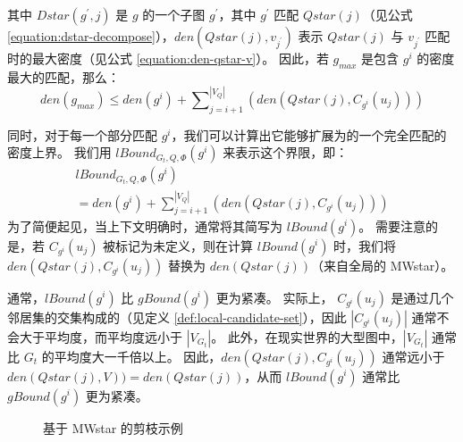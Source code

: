 其中 $Dstar(g^\prime, j)$ 是 $g$ 的一个子图 $g^\prime$，其中 $g^\prime$ 匹配 $Qstar(j)$（见公式 \ref{equation:dstar-decompose}），$den(Qstar(j), v_{j^\prime})$ 表示 $Qstar(j)$ 与 $v_{j^\prime}$ 匹配时的最大密度（见公式 \ref{equation:den-qstar-v}）。
因此，若 $g_{max}$ 是包含 $g^i$ 的密度最大的匹配，那么：
\[
	den(g_{max}) \leq den(g^i) + \sum\nolimits_{j=i+1}^{|V_Q|} \left(den(Qstar(j), C_{g^i}(u_j))\right)
\]

同时，对于每一个部分匹配 $g^i$，我们可以计算出它能够扩展为的一个完全匹配的密度上界。
我们用 $lBound_{G_t, Q, \Phi}(g^i)$ 来表示这个界限，即：
\begin{equation*}
    \begin{multlined}
    lBound_{G_t, Q, \Phi}(g^i) \\ = den(g^i) + \sum\nolimits_{j=i+1}^{|V_Q|} \left(den(Qstar(j), C_{g^i}(u_j))\right)
    \end{multlined}
    \end{equation*}
为了简便起见，当上下文明确时，通常将其简写为 $lBound(g^i)$。
需要注意的是，若 $C_{g^i}(u_j)$ 被标记为未定义，则在计算 $lBound(g^i)$ 时，我们将 $den(Qstar(j), C_{g^i}(u_j))$ 替换为 $den(Qstar(j))$（来自全局的 MWstar）。

通常，$lBound(g^i)$ 比 $gBound(g^i)$ 更为紧凑。
实际上， $C_{g^i}(u_j)$ 是通过几个邻居集的交集构成的（见定义 \ref{def:local-candidate-set}），因此 $|C_{g^i}(u_j)|$ 通常不会大于平均度，而平均度远小于 $|V_{G_t}|$。
此外，在现实世界的大型图中，$|V_{G_t}|$ 通常比 $G_t$ 的平均度大一千倍以上。
因此，$den(Qstar(j), C_{g^i}(u_j))$ 通常远小于 $den(Qstar(j), V)) = den(Qstar(j))$，从而 $lBound(g^i)$ 通常比 $gBound(g^i)$ 更为紧凑。

\begin{figure}[h!]
\centering
{}
\caption{基于 MWstar 的剪枝示例}
\label{fig:exp:mwstar:pruning}
\end{figure}

